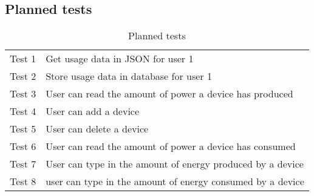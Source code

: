\subsection{Planned tests}
\begin{table}[H]
\centering
{}
\begin{tabular}{|l|l|}
\hline
Test 1&Get usage data in JSON for user 1\\
Test 2&Store usage data in database for user 1\\
Test 3&User can read the amount of power a device has produced\\
Test 4&User can add a device\\
Test 5&User can delete a device\\
Test 6&User can read the amount of power a device has consumed\\
Test 7&User can type in the amount of energy produced by a device\\
Test 8&user can type in the amount of energy consumed by a device\\
\hline
\end{tabular}
\caption{Planned tests}
\label{tab:plannedTable}
\end{table}


